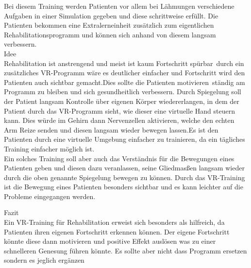 
Bei diesem Training werden Patienten vor allem bei Lähmungen verschiedene Aufgaben in einer Simulation gegeben und diese schrittweise erfüllt. Die Patienten bekommen eine Extralerneinheit zusätzlich zum eigentlichen Rehabilitationsprogramm und können sich anhand von diesem langsam verbessern.\\

Idee\\
Rehabilitation ist anstrengend und meist ist kaum Fortschritt spürbar durch ein zusätzliches VR-Programm wäre es deutlicher einfacher und Fortschritt wird den Patienten auch sichtbar gemacht.Dies sollte die Patienten motivieren ständig am Programm zu bleiben und sich gesundheitlich verbessern. Durch Spiegelung soll der Patient langsam Kontrolle über eigenen Körper wiedererlangen, in dem der Patient durch das VR-Programm sieht, wie dieser eine virtuelle Hand steuern kann. Dies würde im Gehirn dann Nervenzellen aktivieren, welche den echten Arm Reize senden und diesen langsam wieder bewegen lassen.Es ist den Patienten durch eine virtuelle Umgebung einfacher zu trainieren, da ein tägliches Training einfacher möglich ist.\\  \cite{laver2017virtual}
Ein solches Training soll aber auch das Verständnis für die Bewegungen eines Patienten geben und diesen dazu veranlassen, seine Gliedmasßen langsam wieder durch die oben genannte Spiegelung bewegen zu können. Durch das VR-Training ist die Bewegung eines Patienten besonders sichtbar und es kann leichter auf die Probleme eingegangen werden. \\ \cite{sveistrup2004motor}

Fazit\\
Ein VR-Training für Rehabilitation erweist sich besonders als hilfreich, da Patienten ihren eigenen Fortschritt erkennen können. Der eigene Fortschritt könnte diese dann motivieren und positive Effekt auslösen was zu einer schnelleren Genesung führen könnte. Es sollte aber nicht dass Programm ersetzen sondern es jeglich ergänzen


